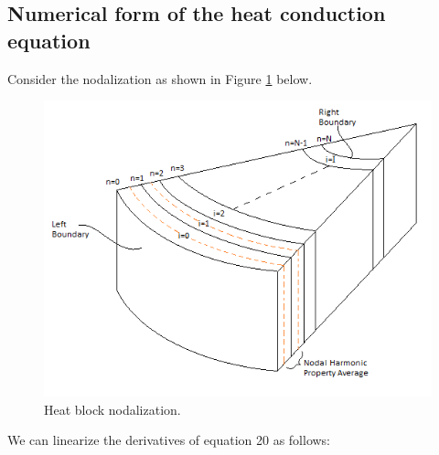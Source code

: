 \documentclass[11pt,letterpaper,titlepage]{article}
\begin{document}
\newpage
\subsection {Numerical form of the heat conduction equation}
Consider the nodalization as shown in Figure \ref{figure:ZZZ_HeatBlock} below.

	\begin{center}
		\begin{minipage}[c]{0.85\textwidth}
	
			\begin{figure}[H]
			
				\includegraphics[width=6in]{ZZZ_HeatBlock.png}
				\caption{Heat block nodalization.}
				\label{figure:ZZZ_HeatBlock}
			\end{figure}
		\end{minipage}
	\end{center}
\vspace{0.5cm}
\noindent

We can linearize the derivatives of equation 20 as follows:
\end{document}
